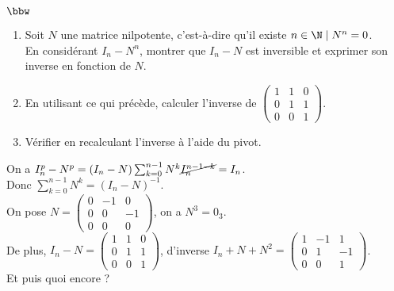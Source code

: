 \documentclass[11pt]{article}
\begin{document}
\begin{exercice}{$\bbw$}{}
    \begin{enumerate}
        \item Soit $N$ une matrice nilpotente, c'est-à-dire qu'il existe $n\in\N\mid N^n=0$.\\
        En considérant $I_n-N^n$, montrer que $I_n-N$ est inversible et exprimer son inverse en fonction de $N$.
        \item En utilisant ce qui précède, calculer l'inverse de $\begin{pmatrix}1&1&0\\0&1&1\\0&0&1\end{pmatrix}$.
        \item Vérifier en recalculant l'inverse à l'aide du pivot.
    \end{enumerate}
    \tcblower
     On a $I_n^p-N^p=(I_n-N)\sum_{k=0}^{n-1}N^k\cancel{I_n^{n-1-k}}=I_n$.\\
    Donc $\sum_{k=0}^{n-1}N^k=(I_n-N)^{-1}$.\\
     On pose $N=\begin{pmatrix}0&-1&0\\0&0&-1\\0&0&0\end{pmatrix}$, on a $N^3=0_3$.\\
    De plus, $I_n-N=\begin{pmatrix}1&1&0\\0&1&1\\0&0&1\end{pmatrix}$, d'inverse $I_n+N+N^2=\begin{pmatrix}1&-1&1\\0&1&-1\\0&0&1\end{pmatrix}$.\\
     Et puis quoi encore ?
\end{exercice}

\vspace*{-0.3cm}
\end{document}
